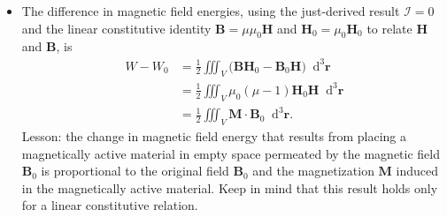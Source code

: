 \documentclass[11pt, a4paper]{article}
\newcommand{\diff}{\mathop{}\!\mathrm{d}} %
\newcommand{\dr}{\diff^{3} \r}  %
\renewcommand{\vec}[1]{\bm{#1}} %
\renewcommand{\r}{\vec{r}}
\newcommand{\B}{\vec{B}} %
\renewcommand{\H}{\vec{H}}  %
\newcommand{\M}{\vec{M}}  %
\newcommand{\mm}{\mu_{0}}  %
\begin{document}
\begin{itemize}
    \item The difference in magnetic field energies, using the just-derived result $ \mathcal{I} = 0 $ and the linear constitutive identity $ \B = \mu \mm \H $  and $ \H_{0} = \mu_{0} \H_{0} $ to relate $ \H $ and $ \B $, is
	\begin{align*}
		W - W_{0} &= \frac{1}{2}\iiint_{V}\big(\B \H_{0} - \B_{0}\H\big)\dr \\
        & = \frac{1}{2} \iiint_{V}\mm (\mu - 1)\H_{0}\H\dr\\
		& = \frac{1}{2}\iiint_{V}\M \cdot \B_{0}\dr.
	\end{align*}
	Lesson: the change in magnetic field energy that results from placing a magnetically active material in empty space permeated by the magnetic field $ \B_{0} $ is proportional to the original field $ \B_{0} $ and the magnetization $ \M $ induced in the magnetically active material. Keep in mind that this result holds only for a linear constitutive relation.
\end{itemize}
\end{document}
